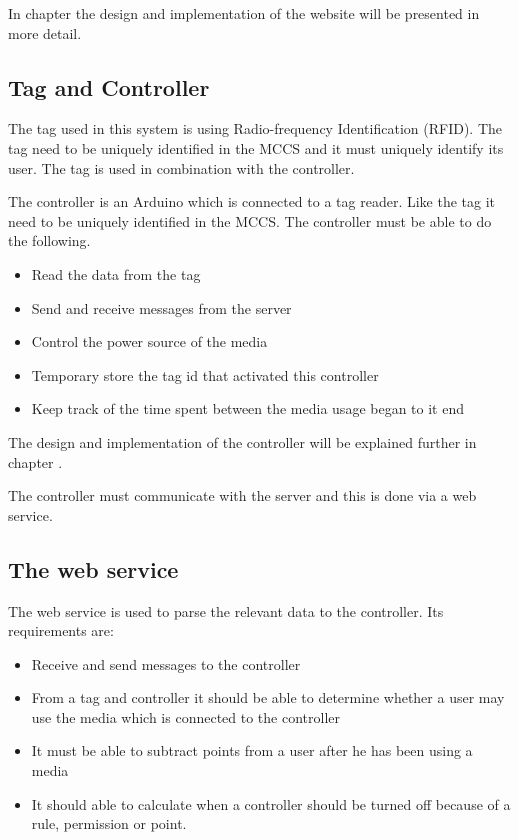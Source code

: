 In chapter  the design and implementation of the website will be presented in more detail. 
 

\subsection{Tag and Controller}
The tag used in this system is using Radio-frequency Identification (RFID). The tag need to be uniquely identified in the MCCS and it must uniquely identify its user. The tag is used in combination with the controller.

The controller is an Arduino which is connected to a tag reader. Like the tag it need to be uniquely identified in the MCCS. The controller must be able to do the following.

\begin{itemize}
	\item Read the data from the tag
	\item Send and receive messages from the server
	\item Control the power source of the media 
	\item Temporary store the tag id that activated this controller
	\item Keep track of the time spent between the media usage began to it end
\end{itemize}
 
The design and implementation of the controller will be explained further in chapter . 

The controller must communicate with the server and this is done via a web service.

\subsection{The web service}

The web service is used to parse the relevant data to the controller. Its requirements are:

\begin{itemize}
	\item Receive and send messages to the controller
	\item From a tag and controller it should be able to determine whether a user may use the media which is connected to the controller
	\item It must be able to subtract points from a user after he has been using a media
	\item It should able to calculate when a controller should be turned off because of a rule, permission or point.
\end{itemize}

